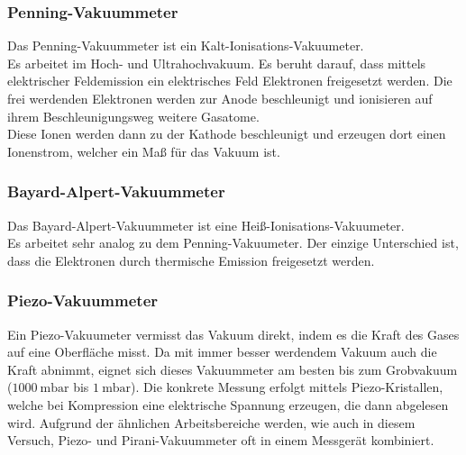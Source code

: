 		\subsubsection{Penning-Vakuummeter}

			\noindent
			Das Penning-Vakuummeter ist ein Kalt-Ionisations-Vakuumeter.\\
			Es arbeitet im Hoch- und Ultrahochvakuum. 
			Es beruht darauf, dass mittels elektrischer Feldemission ein elektrisches Feld Elektronen freigesetzt werden.
			Die frei werdenden Elektronen werden zur Anode beschleunigt und ionisieren auf ihrem Beschleunigungsweg weitere Gasatome.\\
			Diese Ionen werden dann zu der Kathode beschleunigt und erzeugen dort einen Ionenstrom, welcher ein Maß für das Vakuum ist.

		\subsubsection{Bayard-Alpert-Vakuummeter}

			\noindent
			Das Bayard-Alpert-Vakuummeter ist eine Heiß-Ionisations-Vakuumeter.\\ 
			Es arbeitet sehr analog zu dem Penning-Vakuumeter.
			Der einzige Unterschied ist, dass die Elektronen durch thermische Emission freigesetzt werden.
		
		\subsubsection{Piezo-Vakuummeter}
			
			\noindent
			Ein Piezo-Vakuumeter vermisst das Vakuum direkt, indem es die Kraft des Gases auf eine Oberfläche misst. 
			Da mit immer besser werdendem Vakuum auch die Kraft abnimmt, eignet sich dieses Vakuummeter am besten bis zum Grobvakuum ($\SI{1000}{\milli\bar}$ bis $\SI{1}{\milli\bar}$).
			Die konkrete Messung erfolgt mittels Piezo-Kristallen, welche bei Kompression eine elektrische Spannung erzeugen, die dann abgelesen wird.
			Aufgrund der ähnlichen Arbeitsbereiche werden, wie auch in diesem Versuch, Piezo- und Pirani-Vakuummeter oft in einem Messgerät kombiniert.

			\newpage
